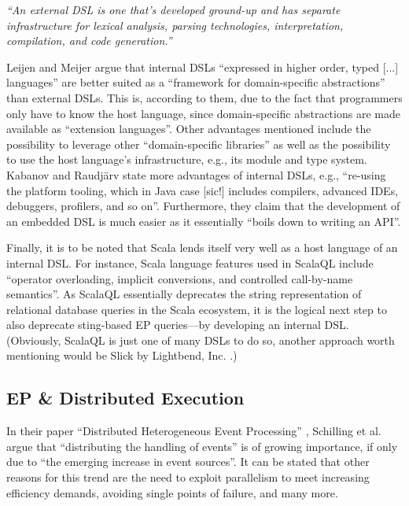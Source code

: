 \documentclass[article, 10pt, type=bsc, colorback, accentcolor=tud8b, parskip=half, bibliography=totocnumbered]{tudthesis}
\begin{document}
\emph{``An external DSL is one that's developed ground-up and has separate infrastructure for lexical analysis, parsing technologies, interpretation, compilation, and code generation.''}

Leijen and Meijer \cite{Leijen:1999:DSE:331960.331977} argue that internal DSLs ``expressed in higher order, typed [...] languages'' are better suited as a ``framework for domain-specific abstractions'' than external DSLs.
This is, according to them, due to the fact that programmers only have to know the host language, since domain-specific abstractions are made available as ``extension languages''.
Other advantages mentioned include the possibility to leverage other ``domain-specific libraries'' as well as the possibility to use the host language's infrastructure, e.g., its module and type system.
Kabanov and Raudjärv \cite{Kabanov:2008:ETD:1411732.1411758} state more advantages of internal DSLs, e.g., ``re-using the platform tooling, which in Java case [sic!] includes compilers, advanced IDEs, debuggers, profilers, and so on''.
Furthermore, they claim that the development of an embedded DSL is much easier as it essentially ``boils down to writing an API''.

Finally, it is to be noted that Scala lends itself very well as a host language of an internal DSL.
For instance, Scala language features used in ScalaQL \cite{Spiewak:2009:SLD:2127907.2127923} include ``operator overloading, implicit conversions, and controlled call-by-name semantics''.
As ScalaQL essentially deprecates the string representation of relational database queries in the Scala ecosystem, it is the logical next step to also deprecate sting-based EP queries---by developing an internal DSL.
(Obviously, ScalaQL is just one of many DSLs to do so, another approach worth mentioning would be Slick by Lightbend, Inc. \cite{slick}.)

\subsection{EP \& Distributed Execution}
\label{sec:ep_distributed_execution}

In their paper ``Distributed Heterogeneous Event Processing'' \cite{Schilling:2010:DHE:1827418.1827453}, Schilling et al. argue that ``distributing the handling of events'' is of growing importance, if only due to ``the emerging increase in event sources''.
It can be stated that other reasons for this trend are the need to exploit parallelism to meet increasing efficiency demands, avoiding single points of failure, and many more.
\end{document}
